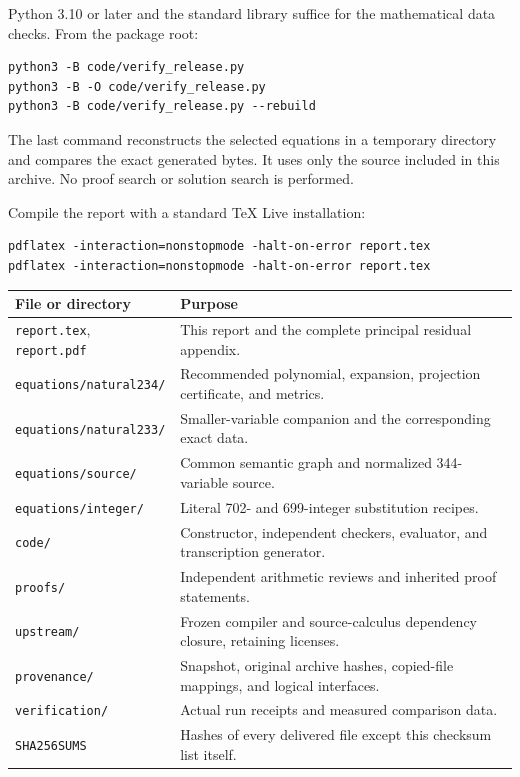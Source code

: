 \documentclass[11pt,a4paper]{article}
\theoremstyle{remark}
\newcommand{\qref}[1]{\nolinkurl{#1}}
\begin{document}
Python 3.10 or later and the standard library suffice for the mathematical
data checks. From the package root:
\begin{lstlisting}
python3 -B code/verify_release.py
python3 -B -O code/verify_release.py
python3 -B code/verify_release.py --rebuild
\end{lstlisting}
The last command reconstructs the selected equations in a temporary
directory and compares the exact generated bytes. It uses only the source
included in this archive. No proof search or solution search is performed.

Compile the report with a standard TeX Live installation:
\begin{lstlisting}
pdflatex -interaction=nonstopmode -halt-on-error report.tex
pdflatex -interaction=nonstopmode -halt-on-error report.tex
\end{lstlisting}

\begin{longtable}{@{}p{}p{}@{}}
\toprule
File or directory & Purpose\\\midrule\endhead
\qref{report.tex}, \qref{report.pdf} & This report and the complete principal residual appendix.\\
\qref{equations/natural234/} & Recommended polynomial, expansion, projection certificate, and metrics.\\
\qref{equations/natural233/} & Smaller-variable companion and the corresponding exact data.\\
\qref{equations/source/} & Common semantic graph and normalized 344-variable source.\\
\qref{equations/integer/} & Literal 702- and 699-integer substitution recipes.\\
\qref{code/} & Constructor, independent checkers, evaluator, and transcription generator.\\
\qref{proofs/} & Independent arithmetic reviews and inherited proof statements.\\
\qref{upstream/} & Frozen compiler and source-calculus dependency closure, retaining licenses.\\
\qref{provenance/} & Snapshot, original archive hashes, copied-file mappings, and logical interfaces.\\
\qref{verification/} & Actual run receipts and measured comparison data.\\
\qref{SHA256SUMS} & Hashes of every delivered file except this checksum list itself.\\
\bottomrule
\end{longtable}
\end{document}
